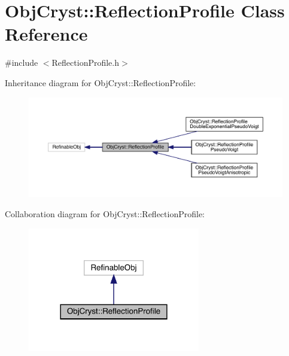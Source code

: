 \hypertarget{class_obj_cryst_1_1_reflection_profile}{}\section{Obj\+Cryst\+::Reflection\+Profile Class Reference}
\label{class_obj_cryst_1_1_reflection_profile}


{\ttfamily \#include $<$Reflection\+Profile.\+h$>$}



Inheritance diagram for Obj\+Cryst\+::Reflection\+Profile\+:
\nopagebreak
\begin{figure}[H]
\begin{center}
\leavevmode
\includegraphics[width=350pt]{class_obj_cryst_1_1_reflection_profile__inherit__graph}
\end{center}
\end{figure}


Collaboration diagram for Obj\+Cryst\+::Reflection\+Profile\+:
\nopagebreak
\begin{figure}[H]
\begin{center}
\leavevmode
\includegraphics[width=213pt]{class_obj_cryst_1_1_reflection_profile__coll__graph}
\end{center}
\end{figure}
